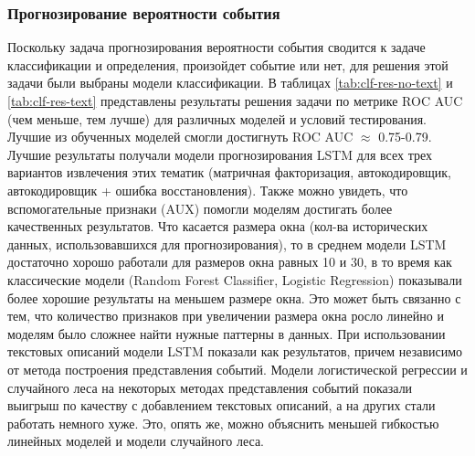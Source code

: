 \subsubsection{Прогнозирование вероятности события}
Поскольку задача прогнозирования вероятности события сводится к задаче классификации и определения, произойдет событие или нет, для решения этой задачи были выбраны модели классификации.
В таблицах \ref{tab:clf-res-no-text} и \ref{tab:clf-res-text} представлены результаты решения задачи по метрике ROC AUC (чем меньше, тем лучше) для различных моделей и условий тестирования. Лучшие из обученных моделей смогли достигнуть ROC AUC $\approx$ 0.75-0.79. Лучшие результаты получали модели прогнозирования LSTM для всех трех вариантов извлечения этих тематик (матричная факторизация, автокодировщик, автокодировщик + ошибка восстановления). Также можно увидеть, что вспомогательные признаки (AUX) помогли моделям достигать более качественных результатов. Что касается размера окна (кол-ва исторических данных, использовавшихся для прогнозирования), то в среднем модели LSTM достаточно хорошо работали для размеров окна равных 10 и 30, в то время как классические модели (Random Forest Classifier, Logistic Regression) показывали более хорошие результаты на меньшем размере окна. Это может быть связанно с тем, что количество признаков при увеличении размера окна росло линейно и моделям было сложнее найти нужные паттерны в данных.
При использовании текстовых описаний модели LSTM показали как результатов, причем независимо от метода построения представления событий. Модели логистической регрессии и случайного леса на некоторых методах представления событий показали выигрыш по качеству с добавлением текстовых описаний, а на других стали работать немного хуже. Это, опять же, можно объяснить меньшей гибкостью линейных моделей и модели случайного леса.
